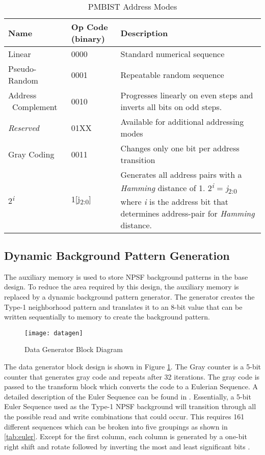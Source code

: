 \begin{table}[H]
  \caption{PMBIST Address Modes}
  \centering
 \begin{tabular}{|p{1in}|p{0.75in}|p{3in}|}
  \hline
  Name & Op Code (binary) & Description \\ [0.5ex]
  \hline\hline
  Linear              & 0000 & Standard numerical sequence  \\ 
  \hline
  Pseudo-Random       & 0001 & Repeatable random sequence \\ 
  \hline
  Address \ Complement  & 0010 & Progresses linearly on even steps and inverts all bits on odd steps.\\ 
  \hline
  \textit{Reserved}            & 01XX & Available for additional addressing modes \\ 
  \hline
  Gray Coding         & 0011 & Changes only one bit per address transition \\ 
  \hline
  2\textsuperscript{\textit{i}}& 1[j\textsubscript{2:0}] & Generates all address pairs with a \textit{Hamming} distance of 1.  2\textsuperscript{\textit{i}} = \textit{j}\textsubscript{2:0} where \textit{i} is the address bit that determines address-pair for \textit{Hamming} distance. \\ 
  \hline
 \end{tabular}
\label{tab:addrmode}
\end{table}

\subsection{Dynamic Background Pattern Generation}
\label{sec:dg}
The auxiliary memory is used to store NPSF background patterns in the base design.  To reduce the area required by this design, the auxiliary memory is replaced by a dynamic background pattern generator.  The generator creates the Type-1 neighborhood pattern and translates it to an 8-bit value that can be written sequentially to memory to create the background pattern.

\begin{figure}[H]
  \centering
  \texttt{[image: datagen]}
  \caption{Data Generator Block Diagram}
  \label{fig:datagen}
\end{figure}
The data generator block design is shown in Figure \ref{fig:datagen}.  The Gray counter is a 5-bit counter that generates gray code and repeats after 32 iterations.  The gray code is passed to the transform block which converts the code to a Eulerian Sequence.  A detailed description of the Euler Sequence can be found in \cite{1675556}.  Essentially, a 5-bit Euler Sequence used as the Type-1 NPSF background will transition through all the possible read and write combinations that could occur.  This requires 161 different sequences which can be broken into five groupings as shown in \ref{tab:euler}.  Except for the first column, each column is generated by a one-bit right shift and rotate followed by inverting the most and least significant bits \cite{00957583}.

